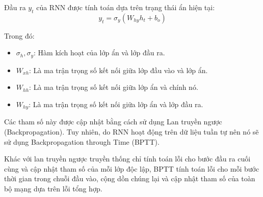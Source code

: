 \documentclass[conference]{IEEEtran}
\begin{document}
Đầu ra \(y_t\) của RNN được tính toán dựa trên trạng thái ẩn hiện tại:
\[
y_t = \sigma_y (W_{hy} h_t + b_o)
\]

Trong đó:
\begin{itemize}
    \item \(\sigma_h, \sigma_y\): Hàm kích hoạt của lớp ẩn và lớp đầu ra.
    \item \(W_{xh}\): Là ma trận trọng số kết nối giữa lớp đầu vào và lớp ẩn.
    \item \(W_{hh}\): Là ma trận trọng số kết nối giữa lớp ẩn và chính nó.
    \item \(W_{hy}\): Là ma trận trọng số kết nối giữa lớp ẩn và lớp đầu ra.
\end{itemize}

Các tham số này được cập nhật bằng cách sử dụng Lan truyền ngược (Backpropagation). Tuy nhiên, do RNN hoạt động trên dữ liệu tuần tự nên nó sẽ sử dụng Backpropagation through Time (BPTT).

Khác với lan truyền ngược truyền thống chỉ tính toán lỗi cho bước đầu ra cuối cùng và cập nhật tham số của mỗi lớp độc lập, BPTT tính toán lỗi cho mỗi bước thời gian trong chuỗi đầu vào, cộng dồn chúng lại và cập nhật tham số của toàn bộ mạng dựa trên lỗi tổng hợp.
\end{document}
